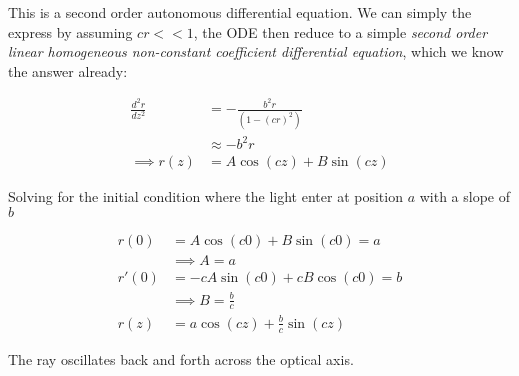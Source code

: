 \documentclass[%
 preprint,
 amsmath,amssymb,
 aps,
 pra,
 fleqn
]{revtex4-2}
\begin{document}
This is a second order autonomous differential equation. We can simply the express by assuming $cr<<1$, the ODE then reduce to a simple \textit{second order linear homogeneous non-constant coefficient differential equation}, which we know the answer already:
\begin{ceqn}
    \begin{align*}
        \frac{d^2 r}{dz^2} &= -\frac{b^2r}{(1-(cr)^2)}\\
        &\approx -b^2 r\\
        \implies r(z) &= A\cos(cz)+B\sin(cz)
    \end{align*}
\end{ceqn}
Solving for the initial condition where the light enter at position $a$ with a slope of $b$
\begin{ceqn}
    \begin{align*}
        r(0) &= A\cos(c0)+B\sin(c0) = a \\
        &\implies A = a\\
        r'(0) &= -cA\sin(c0)+cB\cos(c0) = b \\
        &\implies B = \frac{b}{c}\\
        r(z) &= a\cos(cz)+\frac{b}{c}\sin(cz)
    \end{align*}
\end{ceqn}

The ray oscillates back and forth across the optical axis.
\end{document}
